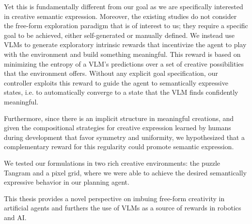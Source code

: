 Yet this is fundamentally different from our goal as we are specifically interested in creative semantic expression.
Moreover, the existing studies do not consider the free-form exploration paradigm that is of interest to us; they require a specific goal to be achieved, either self-generated or manually defined.
We instead use VLMs to generate exploratory intrinsic rewards that incentivize the agent to play with the environment and build something meaningful.
This reward is based on minimizing the entropy of a VLM's predictions over a set of creative possibilities that the environment offers.
Without any explicit goal specification, our controller exploits this reward to guide the agent to semantically expressive states, i.e. to automatically converge to a state that the VLM finds confidently meaningful.


Furthermore, since there is an implicit structure in meaningful creations, and given the compositional strategies for creative expression learned by humans during development \citep{symmetry,compositional} that favor symmetry and uniformity, we hypothesized that a complementary reward for this regularity \citep{rair} could promote semantic expression.

We tested our formulations in two rich creative environments: the puzzle Tangram and a pixel grid, where we were able to achieve the desired semantically expressive behavior in our planning agent.

This thesis provides a novel perspective on imbuing free-form creativity in artificial agents and furthers the use of VLMs as a source of rewards in robotics and AI.
